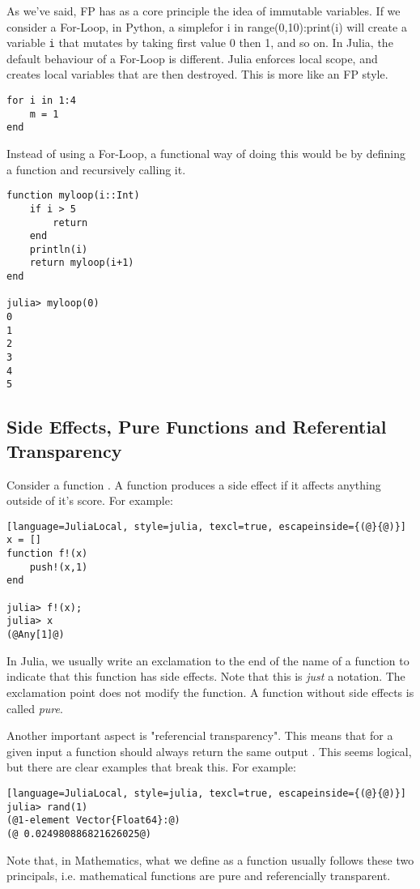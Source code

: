 As we've said, FP has as a core principle the idea of immutable variables.
If we consider a For-Loop, in Python, a simple\lstinline[style=julia]{}\lstinline[style=julia]{}for i in range(0,10):print(i)\lstinline[style=julia]{}\lstinline[style=julia]{}
will create a variable \lstinline[style=julia]{i} that mutates by taking first value 0 then 1, and so on.
In Julia, the default behaviour of a For-Loop is different. Julia enforces local scope,
and creates local variables that are then destroyed. This is more like an FP style.
\bigskip
\begin{lstlisting}[language=JuliaLocal, style=julia, texcl=false]
for i in 1:4
    m = 1
end
\end{lstlisting}
Instead of using a For-Loop, a functional way of doing this would be by defining a function and recursively calling it.
\bigskip
\begin{lstlisting}[language=JuliaLocal, style=julia, texcl=true]
function myloop(i::Int)
    if i > 5
        return
    end
    println(i)
    return myloop(i+1)
end

julia> myloop(0)
0
1
2
3
4
5
\end{lstlisting}

\subsection{Side Effects, Pure Functions and Referential Transparency}


Consider a function . A function produces a side effect if it affects anything outside of it's score. For example:
\bigskip
\begin{lstlisting}[language=JuliaLocal, style=julia, texcl=true, escapeinside={(@}{@)}]
x = []
function f!(x)
    push!(x,1)
end

julia> f!(x);
julia> x
(@Any[1]@)
\end{lstlisting}

In Julia, we usually write an exclamation to the end of the name of a function
to indicate that this function has side effects.
Note that this is \textit{just} a notation.
The exclamation point does not modify the function.
A function without side effects is called \textit{pure}.

Another important aspect is "referencial transparency".
This means that for a given input  a function should always return the same output .
This seems logical, but there are clear examples that break this. For example:
\bigskip
\begin{lstlisting}[language=JuliaLocal, style=julia, texcl=true, escapeinside={(@}{@)}]
julia> rand(1)
(@1-element Vector{Float64}:@)
(@ 0.024980886821626025@)
\end{lstlisting}
Note that, in Mathematics,
what we define as a function usually follows these two principals,
i.e. mathematical functions are pure and referencially transparent.

